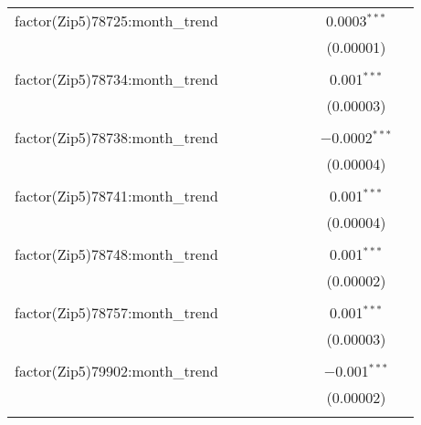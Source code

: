 \begin{table}[H]
{\begin{tabular}{@{\extracolsep{5pt}}lcccccccc}
  factor(Zip5)78725:month\_trend &  &  &  &  &  &  & 0.0003$^{***}$ &  \\  

   &  &  &  &  &  &  & (0.00001) &  \\  

   & & & & & & & & \\  

  factor(Zip5)78734:month\_trend &  &  &  &  &  &  & 0.001$^{***}$ &  \\  

   &  &  &  &  &  &  & (0.00003) &  \\  

   & & & & & & & & \\  

  factor(Zip5)78738:month\_trend &  &  &  &  &  &  & $-$0.0002$^{***}$ &  \\  

   &  &  &  &  &  &  & (0.00004) &  \\  

   & & & & & & & & \\  

  factor(Zip5)78741:month\_trend &  &  &  &  &  &  & 0.001$^{***}$ &  \\  

   &  &  &  &  &  &  & (0.00004) &  \\  

   & & & & & & & & \\  

  factor(Zip5)78748:month\_trend &  &  &  &  &  &  & 0.001$^{***}$ &  \\  

   &  &  &  &  &  &  & (0.00002) &  \\  

   & & & & & & & & \\  

  factor(Zip5)78757:month\_trend &  &  &  &  &  &  & 0.001$^{***}$ &  \\  

   &  &  &  &  &  &  & (0.00003) &  \\  

   & & & & & & & & \\  

  factor(Zip5)79902:month\_trend &  &  &  &  &  &  & $-$0.001$^{***}$ &  \\  

   &  &  &  &  &  &  & (0.00002) &  \\  

   & & & & & & & & \\  


\end{tabular}}
\end{table}
